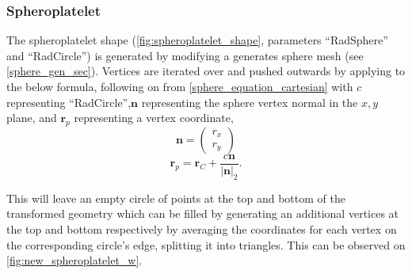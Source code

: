 \subsubsection{Spheroplatelet}
The spheroplatelet shape (\cref{fig:spheroplatelet_shape}, parameters ``RadSphere'' and ``RadCircle'') is generated by modifying a generates sphere mesh (see \cref{sphere_gen_sec}). Vertices are iterated over and pushed outwards by applying to the below formula, following on from \cref{sphere_equation_cartesian} with $c$ representing ``RadCircle'',$\mathbf{n}$ representing the sphere vertex normal in the $x,y$ plane, and $\mathbf{r}_{p}$ representing a vertex coordinate,
\begin{equation}
\mathbf{n}=\begin{pmatrix}
  r_x\\
  r_y
\end{pmatrix}
\end{equation}
\begin{equation}
\mathbf{r}_{p}=\mathbf{r}_C + \frac{c\mathbf{n}}{|\mathbf{n}|_2}.
\end{equation}

This will leave an empty circle of points at the top and bottom of the transformed geometry which can be filled by generating an additional vertices at the top and bottom respectively by averaging the coordinates for each vertex on the corresponding circle's edge, splitting it into triangles. This can be observed on \cref{fig:new_spheroplatelet_w}.

